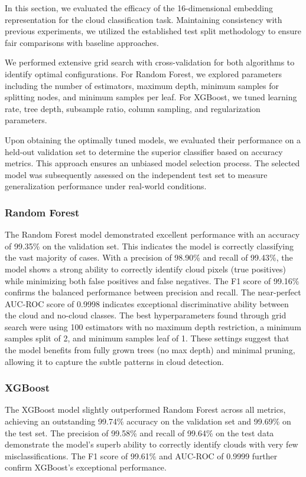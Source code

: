 \documentclass[10pt,letterpaper]{article}
\begin{document}
In this section, we evaluated the efficacy of the 16-dimensional embedding representation for the cloud classification task. Maintaining consistency with previous experiments, we utilized the established test split methodology to ensure fair comparisons with baseline approaches.

We performed extensive grid search with cross-validation for both algorithms to identify optimal configurations. For Random Forest, we explored parameters including the number of estimators, maximum depth, minimum samples for splitting nodes, and minimum samples per leaf. For XGBoost, we tuned learning rate, tree depth, subsample ratio, column sampling, and regularization parameters.

Upon obtaining the optimally tuned models, we evaluated their performance on a held-out validation set to determine the superior classifier based on accuracy metrics. This approach ensures an unbiased model selection process. The selected model was subsequently assessed on the independent test set to measure generalization performance under real-world conditions.

\subsubsection{Random Forest}

The Random Forest model demonstrated excellent performance with an accuracy of 99.35\% on the validation set. This indicates the model is correctly classifying the vast majority of cases. With a precision of 98.90\% and recall of 99.43\%, the model shows a strong ability to correctly identify cloud pixels (true positives) while minimizing both false positives and false negatives. The F1 score of 99.16\% confirms the balanced performance between precision and recall. The near-perfect AUC-ROC score of 0.9998 indicates exceptional discriminative ability between the cloud and no-cloud classes.
The best hyperparameters found through grid search were using 100 estimators with no maximum depth restriction, a minimum samples split of 2, and minimum samples leaf of 1. These settings suggest that the model benefits from fully grown trees (no max depth) and minimal pruning, allowing it to capture the subtle patterns in cloud detection. 

\subsubsection{XGBoost}

The XGBoost model slightly outperformed Random Forest across all metrics, achieving an outstanding 99.74\% accuracy on the validation set and 99.69\% on the test set. The precision of 99.58\% and recall of 99.64\% on the test data demonstrate the model's superb ability to correctly identify clouds with very few misclassifications. The F1 score of 99.61\% and AUC-ROC of 0.9999 further confirm XGBoost's exceptional performance.
\end{document}

